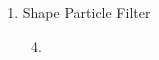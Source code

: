 \documentclass[]{report}
\newlength\figureheight
\newlength\figurewidth
\begin{document}
\begin{enumerate}
		\item Shape Particle Filter
			\begin{enumerate}
				\setcounter{enumii}{3}
				\item
				
				\setlength\figureheight{3.5cm}
				\setlength{}
				\begin{figure}
%						
					\caption{}
					\label{fig:box}
				\end{figure}
			\end{enumerate}
			
	\end{enumerate}
	
\end{document}
